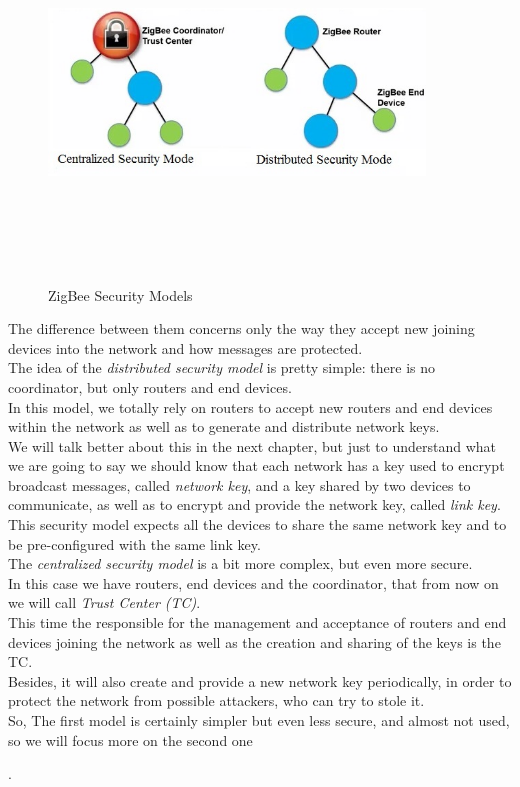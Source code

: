 \documentclass[12pt]{report}
\begin{document}
{\begin{figure}[H]
\includegraphics[width=10cm,height=10cm,keepaspectratio]{security_models}
\centering
\caption{ZigBee Security Models}
\end{figure}

The difference between them concerns only the way they accept new joining devices into the network and how messages are protected.\\

The idea of the \emph{distributed security model} is pretty simple: there is no coordinator, but only routers and end devices.\\
In this model, we totally rely on routers to accept new routers and end devices within the network as well as to generate and distribute network keys.\\
We will talk better about this in the next chapter, but just to understand what we are going to say we should know that each network has a key used to encrypt broadcast messages, called \emph{network key}, and a key shared by two devices to communicate, as well as to encrypt and provide the network key, called \emph{link key}.\\
This security model expects all the devices to share the same network key and to be pre-configured with the same link key.\\

The \emph{centralized security model} is a bit more complex, but even more secure.\\
In this case we have routers, end devices and the coordinator, that from now on we will call \emph{Trust Center (TC)}.\\
This time the responsible for the management and acceptance of routers and end devices joining the network as well as the creation and sharing of the keys is the TC.\\
Besides, it will also create and provide a new network key periodically, in order to protect the network from possible attackers, who can try to stole it.\\

So, The first model is certainly simpler but even less secure, and almost not used, so we will focus more on the second one}.\\
\end{document}
